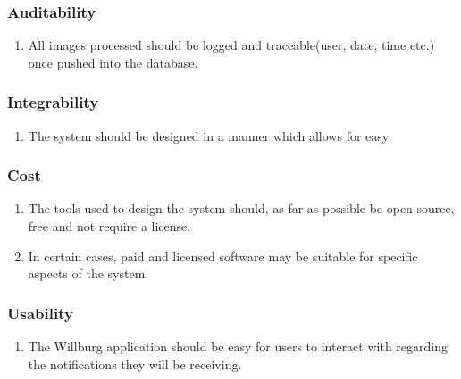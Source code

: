 \documentclass[a4paper,12pt]{report}
\begin{document}
\subsubsection{Auditability}
\begin{enumerate}
	\item All images processed should be logged and traceable(user, date, time etc.) once pushed into the database.
\end{enumerate}
\subsubsection{Integrability}
\begin{enumerate}
	\item The system should be designed in a manner which allows for easy 
\end{enumerate}
\subsubsection{Cost}
\begin{enumerate}
	\item The tools used to design the system should, as far as possible be open source, free and not require a license.
	\item In certain cases, paid and licensed software may be suitable for specific aspects of the system. 
\end{enumerate}
\subsubsection{Usability}
\begin{enumerate}
	\item The Willburg application should be easy for users to interact with regarding the notifications they will be receiving.
\end{enumerate}
\newpage
\end{document}
